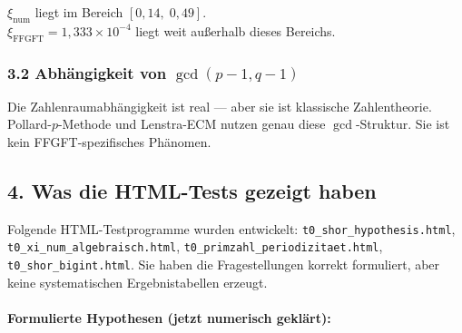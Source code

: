 \begin{mdframed}[style=warn]
$\xi_\text{num}$ liegt im Bereich $[0{,}14,\; 0{,}49]$. \\
$\xi_\text{FFGFT} = 1{,}333 \times 10^{-4}$ liegt weit außerhalb dieses Bereichs.
\end{mdframed}

\subsubsection*{3.2 Abhängigkeit von $\gcd(p-1, q-1)$}

\begin{center}
\end{center}

Die Zahlenraumabhängigkeit ist real — aber sie ist klassische Zahlentheorie.
Pollard-$p$-Methode und Lenstra-ECM nutzen genau diese $\gcd$-Struktur.
Sie ist kein FFGFT-spezifisches Phänomen.

\subsection*{4. Was die HTML-Tests gezeigt haben}

Folgende HTML-Testprogramme wurden entwickelt:
\texttt{t0\_shor\_hypothesis.html}, \texttt{t0\_xi\_num\_algebraisch.html},
\texttt{t0\_primzahl\_periodizitaet.html}, \texttt{t0\_shor\_bigint.html}.
Sie haben die Fragestellungen korrekt formuliert, aber keine systematischen
Ergebnistabellen erzeugt.

\paragraph{Formulierte Hypothesen (jetzt numerisch geklärt):}


